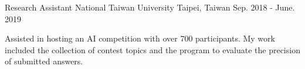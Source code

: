 \begin{cventries}
  \cventry
    {Research Assistant} %
    {National Taiwan University} %
    {Taipei, Taiwan} %
    {Sep. 2018 - June. 2019} %
    {
      \begin{cvitems} %
        \item {Assisted in hosting an AI competition with over 700 participants. My work included the collection of contest topics and the program to evaluate the precision of submitted answers.}
      \end{cvitems}
    }


\end{cventries}
